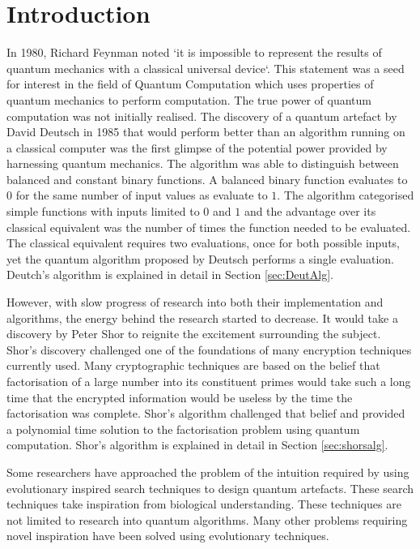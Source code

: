 \chapter{Introduction}
 \setcounter{page}{0} 

In 1980, Richard Feynman noted `it is impossible to represent the results of quantum mechanics with a classical universal device`\cite{Feynman82simulatingphysics}.
This statement was a seed for interest in the field of Quantum Computation which uses properties of quantum mechanics to perform computation.
The true power of quantum computation was not initially realised.
The discovery of a quantum artefact by David Deutsch\cite{Deutsch85quantumtheory} in 1985 that would perform better than an algorithm running on a classical computer was the first glimpse of the potential power provided by harnessing quantum mechanics.
The algorithm was able to distinguish between balanced and constant binary functions.
A balanced binary function evaluates to $0$ for the same number of input values as evaluate to $1$. 
The algorithm categorised simple functions with inputs limited to $0$ and $1$ and the advantage over its classical equivalent was the number of times the function needed to be evaluated.
The classical equivalent requires two evaluations, once for both possible inputs, yet the quantum algorithm proposed by Deutsch performs a single evaluation.
Deutch's algorithm is explained in detail in Section \ref{sec:DeutAlg}.

However, with slow progress of research into both their implementation and algorithms, the energy behind the research started to decrease.
It would take a discovery by Peter Shor\cite{Shor:1994jg} to reignite the excitement surrounding the subject.
Shor's discovery challenged one of the foundations of many encryption techniques currently used.
Many cryptographic techniques are based on the belief that factorisation of a large number into its constituent primes would take such a long time that the encrypted information would be useless by the time the factorisation was complete.
Shor's algorithm challenged that belief and provided a polynomial time solution to the factorisation problem using quantum computation.
Shor's algorithm is explained in detail in Section \ref{sec:shorsalg}.

Some researchers have approached the problem of the intuition required by using evolutionary inspired search techniques to design quantum artefacts.
These search techniques take inspiration from biological understanding.
These techniques are not limited to research into quantum algorithms.
Many other problems requiring novel inspiration have been solved using evolutionary techniques.

